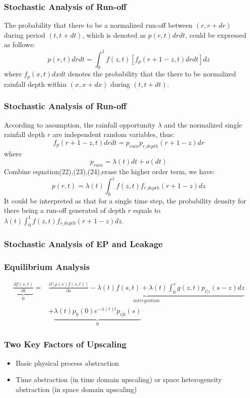 \documentclass{beamer}
\begin{document}
 \begin{frame}
 \frametitle{Stochastic Analysis of Run-off}
The probability that there to be a normalized run-off between $(r,r+dr)$ during period $(t,t+dt)$, which is denoted as $p(r,t)drdt$, could be expressed as follows:
 \begin{equation}
 p(r,t)drdt=\int_{0}^{1} f(z,t)[f_p(r+1-z,t)drdt]dz
 \end{equation}
where $f_p(x,t)dxdt$ denotes the probability that the there to be normalized rainfall depth within $(x, x+dx)$ during $(t, t+dt)$. 
 \end{frame}
  \begin{frame}
 \frametitle{Stochastic Analysis of Run-off}
According to assumption, the rainfall opportunity $\lambda$ and the normalized single rainfall depth $r$ are independent random variables, thus:
\begin{equation}
f_p(r+1-z,t)drdt=p_{rain}p_{r\_depth}(r+1-z)dr
\end{equation}
where
\begin{equation}
p_{rain}=\lambda(t)dt+o(dt)
\end{equation}
Combine equation(22),(23),(24),erase the higher order term, we have:
 \begin{equation}
 p(r,t)=\lambda(t)\int_{0}^{1} f(z,t)f_{r\_depth}(r+1-z)dz
 \end{equation} 
It could be interpreted as that for a single time step, the probability density for there being a run-off generated of depth $r$ equals to $\lambda(t)\int_{0}^{1} f(z,t)f_{r\_depth}(r+1-z)dz$. 
 \end{frame}
\begin{frame}
\frametitle{Stochastic Analysis of EP and Leakage}
\end{frame}
\begin{frame}
\frametitle{Equilibrium Analysis}
 \begin{equation*}
 \begin{split}
 \underbrace{\frac{\partial{f(s,t)}}{\partial t}}_{0}=&\underbrace{\frac{\partial{[\rho(s)f(s,t)]}}{\partial s}-\lambda(t)f(s,t)+\lambda(t)\int_{0}^{s} g(z,t)p_{i|z}(s-z)dz}_{intergration}\\&+\underbrace{\lambda(t)p_0(0)e^{-\lambda(t) t}p_{i|0}(s)}_{0}
 \end{split}
 \end{equation*}

\end{frame}
\begin{frame}
\frametitle{Two Key Factors of Upscaling}
\begin{itemize}
\item Basic physical process abstraction
\item Time abstraction (in time domain upscaling) or space heterogeneity abstraction (in space domain upscaling)
\end{itemize}
\end{frame}
\end{document}
